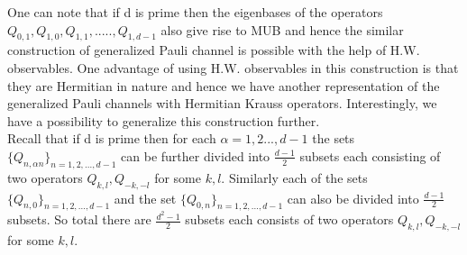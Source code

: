 \documentclass[12pt]{amsart}
\numberwithin{equation}{section}
\begin{document}
One can note that if d is prime then the eigenbases of the operators $Q_{0,1},Q_{1,0},Q_{1,1},.....,Q_{1,d-1}$ also give rise to MUB and hence the similar construction of generalized Pauli channel is possible with the help of H.W. observables. One advantage of using H.W. observables in this construction is that they are Hermitian in nature and hence we have another representation of the generalized Pauli channels with Hermitian Krauss operators. Interestingly,  we have a possibility to generalize this construction further. \\

Recall that if d is prime then for each $\alpha=1,2...,d-1$ the sets $\lbrace Q_{n,\alpha n}\rbrace_{n=1,2,...,d-1}$ can be further divided into $\frac{d-1}{2}$ subsets each consisting of two operators $ Q_{k,l}, Q_{-k,-l}$ for some $k,l$.  Similarly each of the sets $\lbrace Q_{n,0}\rbrace_{n=1,2,...,d-1}$ and the set $\lbrace Q_{0,n}\rbrace_{n=1,2,...,d-1}$ can also be divided into $\frac{d-1}{2}$ subsets. So total there are $\frac{d^2-1}{2}$ subsets each consists of two operators $ Q_{k,l}, Q_{-k,-l}$ for some $k,l$.\\
\end{document}
